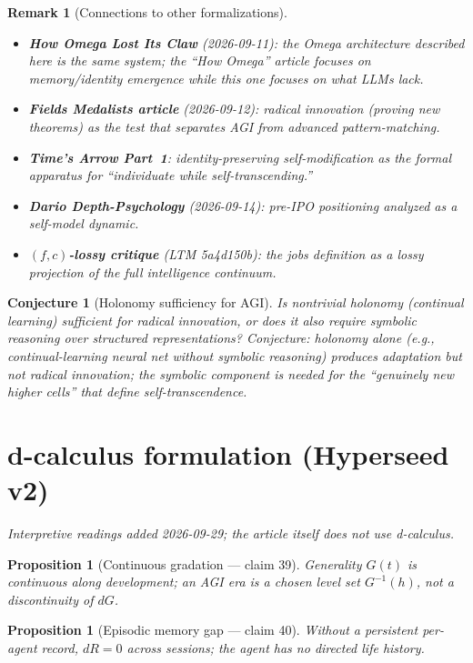 \documentclass[11pt,a4paper]{article}
\newtheorem{proposition}[definition]{Proposition}
\newtheorem{conjecture}[definition]{Conjecture}
\newtheorem{remark}[definition]{Remark}
\begin{document}
\begin{remark}[Connections to other formalizations]
\begin{itemize}
\item \textbf{How Omega Lost Its Claw} (2026-09-11): the Omega architecture
  described here is the same system; the ``How Omega'' article focuses on
  memory/identity emergence while this one focuses on what LLMs lack.
\item \textbf{Fields Medalists article} (2026-09-12): radical innovation
  (proving new theorems) as the test that separates AGI from advanced
  pattern-matching.
\item \textbf{Time's Arrow Part~1}: identity-preserving self-modification
  as the formal apparatus for ``individuate while self-transcending.''
\item \textbf{Dario Depth-Psychology} (2026-09-14): pre-IPO positioning
  analyzed as a self-model dynamic.
\item \textbf{$(f,c)$-lossy critique} (LTM 5a4d150b): the jobs definition
  as a lossy projection of the full intelligence continuum.
\end{itemize}
\end{remark}

\begin{conjecture}[Holonomy sufficiency for AGI]
Is nontrivial holonomy (continual learning) sufficient for radical
innovation, or does it also require symbolic reasoning over structured
representations? Conjecture: holonomy alone (e.g., continual-learning
neural net without symbolic reasoning) produces adaptation but not
radical innovation; the symbolic component is needed for the
``genuinely new higher cells'' that define self-transcendence.
\end{conjecture}


\section{d-calculus formulation (Hyperseed v2)}
\emph{Interpretive readings added 2026-09-29; the article itself does not use d-calculus.}

\begin{proposition}[Continuous gradation --- claim 39]
Generality $G(t)$ is continuous along development; an \emph{AGI era} is a chosen
level set $G^{-1}(h)$, not a discontinuity of $dG$.
\end{proposition}

\begin{proposition}[Episodic memory gap --- claim 40]
Without a persistent per-agent record, $dR=0$ across sessions; the agent has
no directed life history.
\end{proposition}
\end{document}
